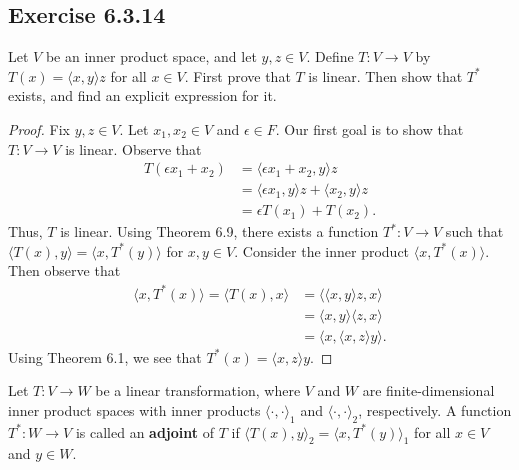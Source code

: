 \subsection*{Exercise 6.3.14} Let \( V  \) be an inner product space, and let \( y,z \in V  \). Define \( T: V \to V  \) by \( T(x) = \langle x , y \rangle z  \) for all \( x \in V  \). First prove that \( T  \) is linear. Then show that \( T^{*}  \) exists, and find an explicit expression for it.
\begin{proof}
Fix \( y,z \in V  \). Let \( {x}_{1}, {x}_{2} \in V  \) and \( \epsilon \in F  \). Our first goal is to show that \( T: V \to V    \) is linear. Observe that
\begin{align*}
    T(\epsilon {x}_{1} + {x}_{2} ) &= \langle \epsilon {x}_{1} + {x}_{2} , y \rangle z   \\
                                   &= \langle \epsilon {x}_{1} , y \rangle z +  \langle {x}_{2} , y \rangle z  \\
                                   &=  \epsilon T({x}_{1}) + T({x}_{2}).
\end{align*}
Thus, \( T  \) is linear. Using Theorem 6.9, there exists a function \( T^{*}: V \to V  \) such that  \( \langle T(x) , y \rangle = \langle x  , T^{*}(y) \rangle \) for \( x,y \in V  \). Consider the inner product \( \langle x  , T^{*}(x) \rangle \). Then observe that
\begin{align*}
    \langle x , T^{*}(x) \rangle = \langle T(x) , x  \rangle &=  \langle \langle x , y \rangle z  ,  x  \rangle \\
                                                             &= \langle x , y \rangle \langle z , x \rangle \\
                                                             &= \langle x , \langle x , z \rangle y \rangle.
\end{align*}
Using Theorem 6.1, we see that \( T^{*}(x) = \langle x , z \rangle y  \).
\end{proof}

\begin{definition}
    Let \( T: V \to W  \) be a linear transformation, where \( V  \) and \( W  \) are finite-dimensional inner product spaces with inner products \( {\langle \cdot , \cdot \rangle}_{1}  \) and \( {\langle \cdot , \cdot \rangle}_{2} \), respectively. A function \( T^{*}: W \to V  \) is called an \textbf{adjoint} of \( T  \) if \( \langle T(x) , y \rangle_{2} = \langle x  , T^{*}(y) \rangle_{1}  \) for all \( x \in V  \) and \( y \in W  \).
\end{definition}

